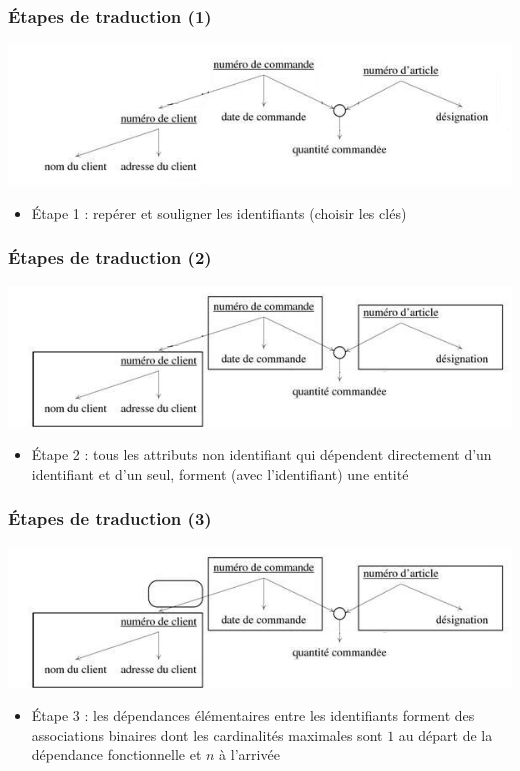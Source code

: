 \begin{frame}
  \frametitle{Étapes de traduction (1)}
  \begin{center}
    \includegraphics[width=0.9\linewidth]{graphe_identifie_1.jpg}
  \end{center}
  \begin{itemize}
    \item Étape 1 : repérer et souligner les identifiants (choisir les clés)
  \end{itemize}
\end{frame}

\begin{frame}
  \frametitle{Étapes de traduction (2)}
  \begin{center}
    \includegraphics[width=0.9\linewidth]{graphe_identifie_2.jpg}
  \end{center}
  \begin{itemize}
    \item Étape 2 : tous les attributs non identifiant qui dépendent directement d'un identifiant et d'un
      seul, forment (avec l'identifiant) une entité
  \end{itemize}
\end{frame}

\begin{frame}
  \frametitle{Étapes de traduction (3)}
  \begin{center}
    \includegraphics[width=0.9\linewidth]{graphe_identifie_3.jpg}
  \end{center}
  \begin{itemize}
    \item Étape 3 : les dépendances élémentaires entre les identifiants forment des associations
      binaires dont les cardinalités maximales sont $1$ au départ de la dépendance fonctionnelle et $n$ à
      l'arrivée
  \end{itemize}
\end{frame}

